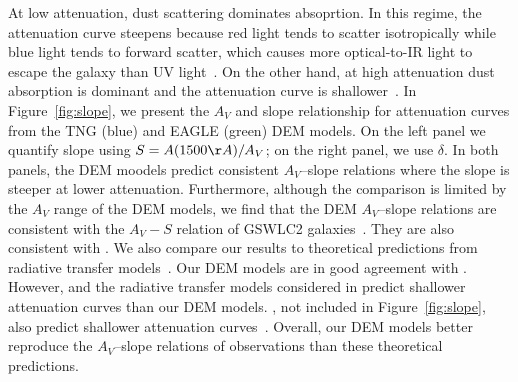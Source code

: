 At low attenuation, dust scattering dominates absoprtion. In this regime,
the attenuation curve steepens because red light tends to
scatter isotropically while blue light tends to forward scatter, which causes
more optical-to-IR light to escape the galaxy than UV light~\citep{gordon1994,
witt2000, draine2003}. On the other hand, at high attenuation dust absorption 
is dominant and the attenuation curve is shallower~\citep{chevallard2013}.
In Figure~\ref{fig:slope}, we present the $A_V$ and slope relationship 
for attenuation curves from the TNG (blue) and EAGLE (green) DEM models. On the
left panel we quantify slope using $S = A(1500\AA)/A_V$; on the right
panel, we use $\delta$. In both panels, the DEM moodels predict consistent 
$A_V$--slope relations where the slope is steeper at lower 
attenuation. Furthermore, although the comparison is limited by the $A_V$ range
of the DEM models, we find that the DEM $A_V$--slope relations are consistent with 
the $A_V - S$ relation of GSWLC2 galaxies~\citep[black shaded][]{salim2020}.
They are also consistent with \cite{leja2017}. 
We also compare our results to theoretical predictions from radiative transfer
models~\citep{witt2000, inoue2005, chevallard2013}. Our DEM models are in good 
agreement with \cite{witt2000}. However, \cite{inoue2005} and the radiative
transfer models considered in \cite{chevallard2013} predict shallower attenuation curves than our DEM models. 
\cite{narayanan2018}, not included in Figure~\ref{fig:slope}, 
also predict shallower attenuation curves~\citep{salim2020}. Overall, our DEM models 
better reproduce the $A_V$--slope relations of observations than these
theoretical predictions.


